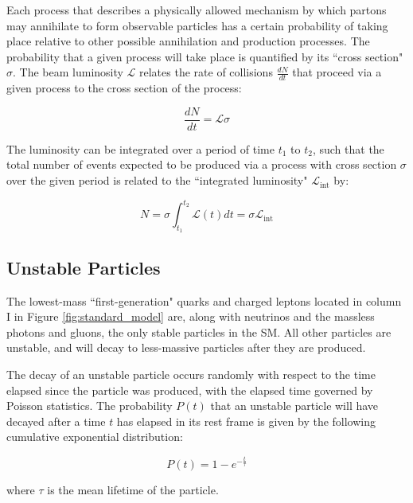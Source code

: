 Each process that describes a physically allowed mechanism by which partons may annihilate to form observable particles has a certain probability of taking place relative to other possible annihilation and production processes. The probability that a given process will take place is quantified by its ``cross section" \(\sigma\). The beam luminosity \(\mathcal{L}\) relates the rate of collisions \(\frac{dN}{dt}\) that proceed via a given process to the cross section of the process:

\begin{equation}
\frac{dN}{dt} = \mathcal{L}\sigma
\end{equation}

The luminosity can be integrated over a period of time \(t_1\) to \(t_2\), such that the total number of events expected to be produced via a process with cross section \(\sigma\) over the given period is related to the ``integrated luminosity" \(\mathcal{L}_\text{int}\) by:

\begin{equation}
\label{eq:integrated_lumi}
N = \sigma\int_{t_1}^{t_2}\mathcal{L}(t)dt = \sigma\mathcal{L}_\text{int}
\end{equation}

\subsection{Unstable Particles}

The lowest-mass ``first-generation" quarks and charged leptons located in column I in Figure \ref{fig:standard_model} are, along with neutrinos and the massless photons and gluons, the only stable particles in the SM. All other particles are unstable, and will decay to less-massive particles after they are produced. 

The decay of an unstable particle occurs randomly with respect to the time elapsed since the particle was produced, with the elapsed time governed by Poisson statistics. The probability \(P(t)\) that an unstable particle will have decayed after a time \(t\) has elapsed in its rest frame is given by the following cumulative exponential distribution:

\begin{equation}
\label{eq:particle_decay}
P(t) = 1-e^{-\frac{t}{\tau}} %
\end{equation}

\noindent where \(\tau\) is the mean lifetime of the particle.

